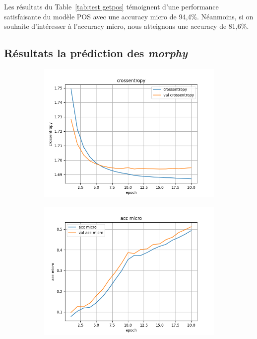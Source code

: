 \documentclass[a4paper]{article}
\begin{document}
Les résultats du Table~\ref{tab:test getpos} témoignent d'une performance satisfaisante du modèle POS avec une accuracy micro de 94,4\%. Néanmoins, si on souhaite d'intéresser à l'accuracy micro, nous atteignons une accuracy de 81,6\%.

\subsection{Résultats la prédiction des \textit{morphy}}

\begin{figure}[H]
    \centering
    \begin{subfigure}{0.32\textwidth}
        \centering
        \includegraphics[width=\linewidth]{../logs/supertag/crossentropy.png}
    \end{subfigure}
    \begin{subfigure}{0.32\textwidth}
        \centering
        \includegraphics[width=\linewidth]{../logs/supertag/acc micro.png}

\end{subfigure}
\end{figure}
\end{document}

